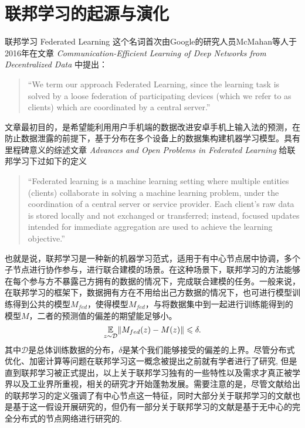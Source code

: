 \section{联邦学习的起源与演化}
\label{sec:chap1-fl-origin}

联邦学习 Federated Learning 这个名词首次由Google的研究人员McMahan等人于2016年在文章 \emph{Communication-Efficient Learning of Deep Networks from Decentralized Data}\cite{mcmahan2017fed_avg} 中提出：
\begin{quote}
    ``We term our approach Federated Learning, since the learning task is solved by a loose federation of participating devices (which we refer to as clients) which are coordinated by a central server.''
\end{quote}
文章\parencite{mcmahan2017fed_avg}最初目的，是希望能利用用户手机端的数据改进安卓手机上输入法的预测，在防止数据泄露的前提下，基于分布在多个设备上的数据集构建机器学习模型。具有里程碑意义的综述文章 \emph{Advances and Open Problems in Federated Learning}\cite{kairouz2019advances_fl} 给联邦学习下过如下的定义
\begin{quote}
    ``Federated learning is a machine learning setting where multiple entities (clients) collaborate in solving a machine learning problem, under the coordination of a central server or service provider. Each client's raw data is stored locally and not exchanged or transferred; instead, focused updates intended for immediate aggregation are used to achieve the learning objective.''
\end{quote}
也就是说，联邦学习是一种新的机器学习范式，适用于有中心节点居中协调，多个子节点进行协作参与，进行联合建模的场景。在这种场景下，联邦学习的方法能够在每个参与方不暴露己方拥有的数据的情况下，完成联合建模的任务。一般来说，在联邦学习的框架下，数据拥有方在不用给出己方数据的情况下，也可进行模型训练得到公共的模型$M_{fed}$，使得模型$M_{fed}$，与将数据集中到一起进行训练能得到的模型$M$，二者的预测值的偏差的期望能足够小。
\begin{equation}
\label{eq:general-fl}
\operatorname*{\mathbb{E}}_{z\sim\mathcal{D}} \lVert M_{fed}(z) - M(z) \rVert \leqslant \delta.
\end{equation}
其中$\mathcal{D}$是总体训练数据的分布，$\delta$是某个我们能够接受的偏差的上界。尽管分布式优化、加密计算等问题在联邦学习这一概念被提出之前就有学者进行了研究\cite{boyd2011distributed, dist_pca_2014_nips, Gentry_2009_FHE, Nikolaenko_2013}, 但是直到联邦学习被正式提出\cite{mcmahan2017fed_avg}，以上关于联邦学习独有的一些特性以及需求才真正被学界以及工业界所重视，相关的研究才开始蓬勃发展。需要注意的是，尽管文献\parencite{kairouz2019advances_fl}给出的联邦学习的定义强调了有中心节点这一特征，同时大部分关于联邦学习的文献也是基于这一假设开展研究的，但仍有一部分关于联邦学习的文献是基于无中心的完全分布式的节点网络进行研究的\cite{elgabli2020gadmm, issaid2020cq-ggadmm}.

